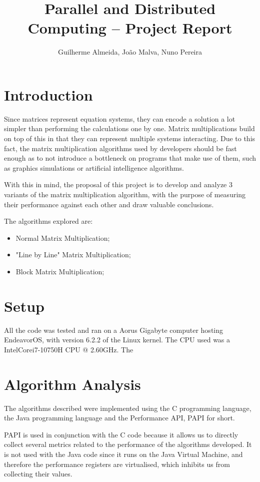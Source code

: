 \documentclass[11pt,a4paper]{article}
\title{Parallel and Distributed Computing -- \nth{1} Project Report}
\author{Guilherme Almeida, João Malva, Nuno Pereira}
\begin{document}
\maketitle
\pagebreak

\tableofcontents
\pagebreak

\section{Introduction}

Since matrices represent equation systems, they can encode a solution a lot simpler than performing the calculations one by one. Matrix multiplications build on top of this in that they can represent multiple systems interacting. Due to this fact, the matrix multiplication algorithms used by developers should be fast enough as to not introduce a bottleneck on programs that make use of them, such as graphics simulations or artificial intelligence algorithms.

With this in mind, the proposal of this project is to develop and analyze 3 variants of the matrix multiplication algorithm, with the purpose of measuring their performance against each other and draw valuable conclusions.

The algorithms explored are:
\begin{itemize}
    \item Normal Matrix Multiplication;
    \item "Line by Line" Matrix Multiplication;
    \item Block Matrix Multiplication;
\end{itemize}

\section{Setup}

All the code was tested and ran on a Aorus Gigabyte computer hosting EndeavorOS, with version 6.2.2 of the Linux kernel. The CPU used was a Intel\textregistered Core\texttrademark i7-10750H CPU @ 2.60GHz. The 

\section{Algorithm Analysis}

The algorithms described were implemented using the C programming language, the Java programming language and the Performance API, PAPI for short.

PAPI is used in conjunction with the C code because it allows us to directly collect several metrics related to the performance of the algorithms developed.
It is not used with the Java code since it runs on the Java Virtual Machine, and therefore the performance registers are virtualised, which inhibits us from collecting their values.
\end{document}
